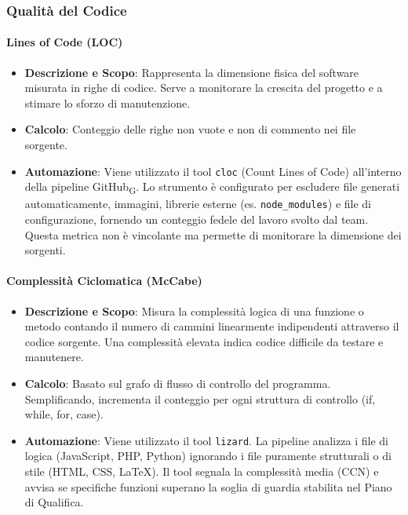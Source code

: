 \documentclass[11pt,a4paper]{article}
\newcommand{\gls}[1]{#1\textsubscript{G}}
\begin{document}
\subsubsection{Qualità del Codice}
\paragraph{Lines of Code (LOC)}
\begin{itemize}
    \item \textbf{Descrizione e Scopo}: Rappresenta la dimensione fisica del software misurata in righe di codice. Serve a monitorare la crescita del progetto e a stimare lo sforzo di manutenzione.
    \item \textbf{Calcolo}: Conteggio delle righe non vuote e non di commento nei file sorgente.
    \item \textbf{Automazione}: Viene utilizzato il tool \texttt{cloc} (Count Lines of Code) all'interno della pipeline \gls{GitHub}. Lo strumento è configurato per escludere file generati automaticamente, immagini, librerie esterne (es. \texttt{node\_modules}) e file di configurazione, fornendo un conteggio fedele del lavoro svolto dal team. Questa metrica non è vincolante ma permette di monitorare la dimensione dei sorgenti.
\end{itemize}

\paragraph{Complessità Ciclomatica (McCabe)}
\begin{itemize}
    \item \textbf{Descrizione e Scopo}: Misura la complessità logica di una funzione o metodo contando il numero di cammini linearmente indipendenti attraverso il codice sorgente. Una complessità elevata indica codice difficile da testare e manutenere.
    \item \textbf{Calcolo}: Basato sul grafo di flusso di controllo del programma. Semplificando, incrementa il conteggio per ogni struttura di controllo (if, while, for, case).
    \item \textbf{Automazione}: Viene utilizzato il tool \texttt{lizard}. La pipeline analizza i file di logica (JavaScript, PHP, Python) ignorando i file puramente strutturali o di stile (HTML, CSS, LaTeX). Il tool segnala la complessità media (CCN) e avvisa se specifiche funzioni superano la soglia di guardia stabilita nel Piano di Qualifica.
\end{itemize}
\end{document}
